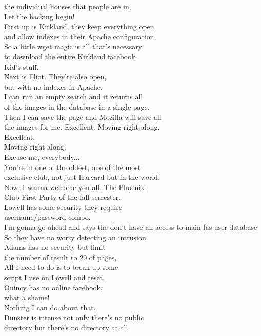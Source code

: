 \documentclass{article}
\begin{document}
\begin{multicols}{3}
the individual houses that people are in,\\
Let the hacking begin!\\
First up is Kirkland, they keep everything open\\
and allow indexes in their Apache configuration,\\
So a little wget magic is all that's necessary\\
to download the entire Kirkland facebook.\\
Kid's stuff.\\
Next is Eliot. They're also open,\\
but with no indexes in Apache.\\
I can run an empty search and it returns all\\
of the images in the database in a single page.\\
Then I can save the page and Mozilla will save all\\
the images for me. Excellent. Moving right along.\\
Excellent.\\
Moving right along.\\
Excuse me, everybody...\\
You're in one of the oldest, one of the most\\
exclusive club, not just Harvard but in the world.\\
Now, I wanna welcome you all, The Phoenix\\
Club First Party of the fall semester.\\
Lowell has some security they require\\
username/password combo.\\
I'm gonna go ahead and says the don't have an access to main fas user database\\
So they have no worry detecting an intrusion.\\
Adams has no security but limit\\
the number of result to 20 of pages,\\
All I need to do is to break up some\\
script I use on Lowell and reset.\\
Quincy has no online facebook,\\
what a shame!\\
Nothing I can do about that.\\
Dunster is intense not only there's no public\\
directory but there's no directory at all.\\

\end{multicols}
\end{document}
